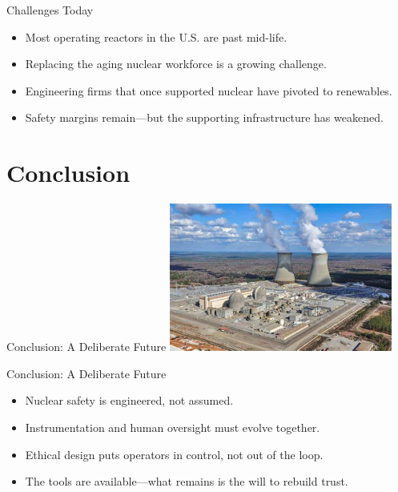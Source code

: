 \documentclass{beamer}
\begin{document}
\begin{frame}{Challenges Today}
  \begin{itemize}
    \item Most operating reactors in the U.S. are past mid-life.
    \item Replacing the aging nuclear workforce is a growing challenge.
    \item Engineering firms that once supported nuclear have pivoted to renewables.
    \item Safety margins remain—but the supporting infrastructure has weakened.
  \end{itemize}
\end{frame}

\section{Conclusion}

\begin{frame}{Conclusion: A Deliberate Future}
  \centering
  \includegraphics[width=0.55\textwidth]{vogtle}
\end{frame}

\begin{frame}{Conclusion: A Deliberate Future}
  \begin{itemize}
    \item Nuclear safety is engineered, not assumed.
    \item Instrumentation and human oversight must evolve together.
    \item Ethical design puts operators in control, not out of the loop.
    \item The tools are available—what remains is the will to rebuild trust.
  \end{itemize}
\end{frame}
\end{document}
